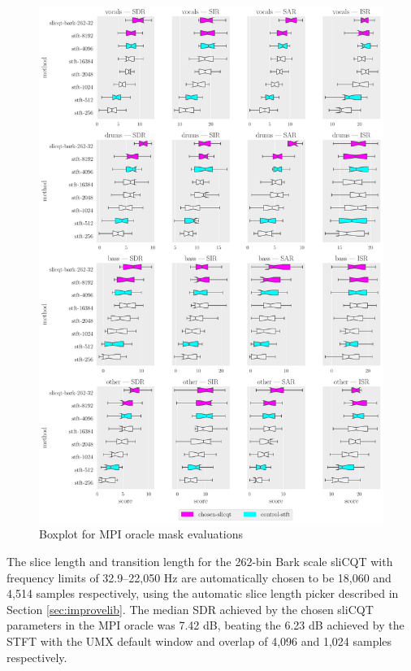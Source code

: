 \documentclass[report.tex]{subfiles}
\begin{document}
\begin{figure}[ht]
	\centering
	\includegraphics[width=\textwidth]{./images-bss/oracle_boxplot.pdf}
	\caption{Boxplot for MPI oracle mask evaluations}
	\label{fig:oraclebssboxplot}
\end{figure}

The slice length and transition length for the 262-bin Bark scale sliCQT with frequency limits of 32.9--22,050 Hz are automatically chosen to be 18,060 and 4,514 samples respectively, using the automatic slice length picker described in Section \ref{sec:improvelib}. The median SDR achieved by the chosen sliCQT parameters in the MPI oracle was 7.42 dB, beating the 6.23 dB achieved by the STFT with the UMX default window and overlap of 4,096 and 1,024 samples respectively.
\end{document}
